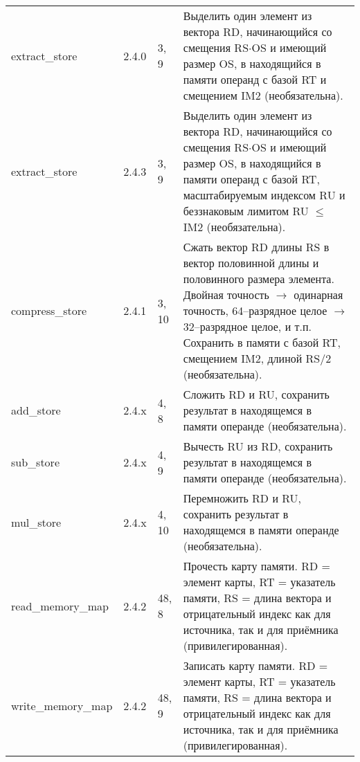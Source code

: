 \documentclass[forwardcom.tex]{subfiles}
\begin{document}
\begin{longtable}{|p{25mm}|p{16mm}|p{9mm}|p{99mm}|}
extract\_store    & 2.4.0            & 3, 9              & Выделить один элемент из вектора RD, начинающийся со смещения RS$\cdot$OS и имеющий размер OS, в находящийся в памяти операнд с базой RT и смещением IM2 (необязательна). \\
extract\_store    & 2.4.3            & 3, 9              & Выделить один элемент из вектора RD, начинающийся со смещения RS$\cdot$OS и имеющий размер OS, в находящийся в памяти операнд с базой RT, масштабируемым индексом RU и беззнаковым лимитом RU $\leq$ IM2 (необязательна). \\
compress\_store   &2.4.1             & 3, 10             & Сжать вектор RD длины RS в вектор половинной длины и половинного размера элемента. Двойная точность $\rightarrow$ одинарная точность, 64--разрядное целое $\rightarrow$ 32--разрядное целое, и т.п. Сохранить в памяти с базой RT, смещением IM2, длиной RS/2 (необязательна). \\
add\_store        & 2.4.x            & 4, 8              & Сложить RD и RU, сохранить результат в находящемся в памяти операнде (необязательна). \\
sub\_store        & 2.4.x            & 4, 9              & Вычесть RU из RD, сохранить результат в находящемся в памяти операнде (необязательна). \\
mul\_store        & 2.4.x            & 4, 10             & Перемножить RD и RU, сохранить результат в находящемся в памяти операнде (необязательна). \\
read\_memory\_\newline map  & 2.4.2 & 48, 8 & Прочесть карту памяти. RD = элемент карты, RT = указатель памяти, RS = длина вектора и отрицательный индекс как для источника, так и для приёмника (привилегированная). \\
write\_memory\_\newline map & 2.4.2 & 48, 9 & Записать карту памяти. RD = элемент карты, RT = указатель памяти, RS = длина вектора и отрицательный индекс как для источника, так и для приёмника (привилегированная). \\ \hline
\end{longtable}
\end{document}
